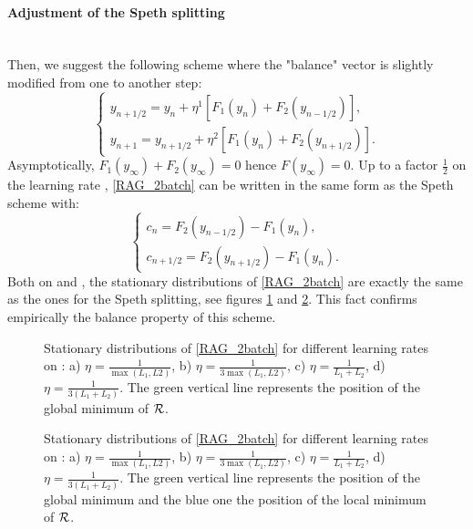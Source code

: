 \paragraph{Adjustment of the Speth splitting}
~~\\
Then, we suggest the following scheme where the "balance" vector is slightly modified from one to another step:
\begin{equation}
	\left\{
	\begin{array}{ll}
		y_{n+1/2} = y_n + \eta^1 \left[F_1(y_n)+F_2(y_{n-1/2})\right],\\
		y_{n+1} = y_{n+1/2} + \eta^2 \left[F_1(y_n)+F_2(y_{n+1/2})\right].
	\end{array}
	\right.
	\label{RAG_2batch}
\end{equation}
Asymptotically, $F_1(y_{\infty})+F_2(y_{\infty})=0$ hence $F(y_{\infty})=0$.
Up to a factor $\frac{1}{2}$ on the learning rate , 
\eqref{RAG_2batch} can be written in the same form as the Speth scheme with:
\begin{equation*}
	\left\{
	\begin{array}{ll}
		c_n = F_2(y_{n-1/2})-F_1(y_n),\\
		c_{n+1/2} = F_2(y_{n+1/2})-F_1(y_n).
	\end{array}
	\right.
\end{equation*}
Both on \exOne and \exTwo, the stationary distributions of \eqref{RAG_2batch} are exactly the same as the ones for the Speth splitting, see figures \ref{IAG_ex1} and \ref{IAG_ex2}. This fact confirms empirically the balance property of this scheme.

\begin{figure}[h!]
	\centering
	\scalebox{0.45}{}
	\caption{Stationary distributions of \eqref{RAG_2batch} for different learning rates on \exOne: a) $\eta=\frac{1}{\max(L_1,L2)}$, b) $\eta=\frac{1}{3\max(L_1,L2)}$, c) $\eta=\frac{1}{L_1+L_2}$, d) $\eta=\frac{1}{3(L_1+L_2)}$. The green vertical line represents the position of the global minimum of $\mathcal{R}$.}
	\label{IAG_ex1}
\end{figure}

\begin{figure}[h!]
	\centering
	\scalebox{0.45}{}
	\caption{Stationary distributions of \eqref{RAG_2batch} for different learning rates on \exTwo: a) $\eta=\frac{1}{\max(L_1,L2)}$, b) $\eta=\frac{1}{3\max(L_1,L2)}$, c) $\eta=\frac{1}{L_1+L_2}$, d) $\eta=\frac{1}{3(L_1+L_2)}$. The green vertical line represents the position of the global minimum and the blue one the position of the local minimum of $\mathcal{R}$.}
	\label{IAG_ex2}
\end{figure}

